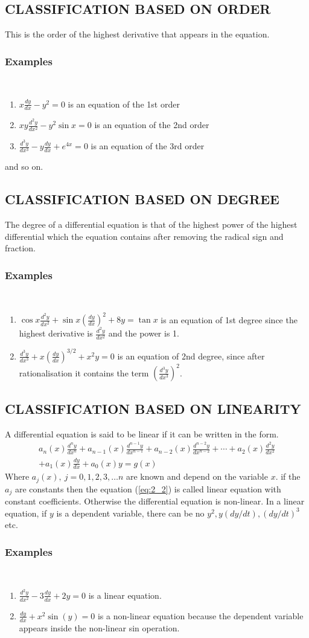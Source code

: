 \documentclass[11pt]{report}
\newcommand{\spn}[1]{\\[#1cm]}
\newcommand{\refn}[1]{(\ref{#1})}
\newcommand{\refx}[1]{\refn{eq:#1}}
\newcommand{\dsp}{\displaystyle}
\newcommand{\examples}{\subsubsection*{Examples}{~}\spn{-1}}
\begin{document}
	\subsection{CLASSIFICATION BASED ON ORDER}
	This is the order of the highest derivative that appears in the equation.\spn{-1.3}
	\examples
	\begin{enumerate}
		\item $\dsp x\frac{dy}{dx} - y^2 = 0$ is an equation of the 1st order
		\item $\dsp xy\frac{d^2y}{dx^2} - y^2\sin x = 0$ is an equation of the 2nd order
		\item $\dsp\frac{d^3y}{dx^3} - y\frac{dy}{dx}+e^{4x} = 0$ is an equation of the 3rd order
	\end{enumerate}
	and so on.
	
	\subsection{CLASSIFICATION BASED ON DEGREE}
	The degree of a differential equation is that of the highest power of the highest differential which the equation contains after removing the radical sign and fraction. \spn{-1.3}
	\examples
	\begin{enumerate}
		\item $\dsp \cos x \frac{d^2 y}{dx^2} + \sin x\left(\frac{dy}{dx}\right)^2 + 8y = \tan x $ is an equation of 1st degree since the highest derivative is $\dsp \frac{d^2y}{dx^2}$ and the power is 1.
		
		\item $\dsp \frac{d^3 y}{dx^3}+ x\left(\frac{dy}{dx}\right)^{3/2} + x^2 y = 0$ is an equation of 2nd degree, since after rationalisation it contains the term $\dsp\left(\frac{d^3y}{dx^3}\right)^2$.
	\end{enumerate}
	
	
	\subsection{CLASSIFICATION BASED ON LINEARITY}
	A differential equation is said to be linear if it can be written in the form.
	\begin{multline}
		a_n(x)\frac{d^ny}{dx^n} + a_{n-1}(x)\frac{d^{n-1}y}{dx^{n-1}} + a_{n-2}(x)\frac{d^{n-2}y}{dx^{n-2}} + \cdots + a_2(x)\frac{d^2y}{dx^2} \\+ a_1(x)\frac{dy}{dx} + a_0(x)y=g(x)\label{eq:2_2}
	\end{multline}
	Where $a_j(x),~ j = 0, 1, 2, 3,\ldots n$ are known and depend on the variable $x$. if the $a_j$ are constants then the equation \refx{2_2} is called linear equation with constant coefficients. Otherwise the differential equation is non-linear. In a linear equation, if $y$ is a dependent variable, there can be no $y^2, y(dy/dt), (dy/dt)^3$ etc.\spn{-1.25}
	\examples
	\begin{enumerate}
		\item $\dsp\frac{d^2 y}{dx^2} - 3\frac{dy}{dx} + 2y = 0$ is a linear equation.
		\item $\dsp \frac{dy}{dx} + x^2\sin(y)=0$ is a non-linear equation because the dependent variable appears inside the non-linear sin operation.
	\end{enumerate}
	
\end{document}
